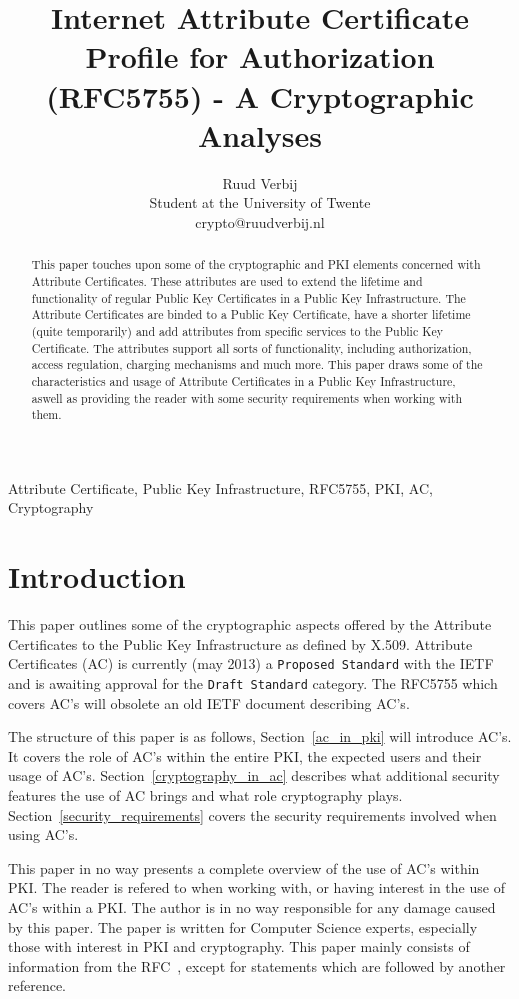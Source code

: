 \documentclass[10pt,conference,a4paper]{IEEEtran}
\title{Internet Attribute Certificate Profile for Authorization (RFC5755) - A Cryptographic Analyses}
\author{Ruud Verbij \\ Student at the University of Twente \\ crypto@ruudverbij.nl}
\begin{document}
\maketitle

\begin{abstract}
This paper touches upon some of the cryptographic and PKI elements concerned with Attribute Certificates. These attributes are used to extend the lifetime and functionality of regular Public Key Certificates in a Public Key Infrastructure. The Attribute Certificates are binded to a Public Key Certificate, have a shorter lifetime (quite temporarily) and add attributes from specific services to the Public Key Certificate. The attributes support all sorts of functionality, including authorization, access regulation, charging mechanisms and much more. This paper draws some of the characteristics and usage of Attribute Certificates in a Public Key Infrastructure, aswell as providing the reader with some security requirements when working with them.
\end{abstract}

\begin{IEEEkeywords}
Attribute Certificate, Public Key Infrastructure, RFC5755, PKI, AC, Cryptography
\end{IEEEkeywords}

\section{Introduction}
\label{Introduction}
This paper outlines some of the cryptographic aspects offered by the Attribute Certificates\cite{rfc_ac} to the Public Key Infrastructure as defined by X.509\cite{rfc_x509}. Attribute Certificates (AC) is currently (may 2013) a \texttt{Proposed Standard} with the IETF and is awaiting approval for the \texttt{Draft Standard} category. The RFC5755 which covers AC's will obsolete an old IETF document describing AC's\cite{rfc_oldac}.

The structure of this paper is as follows, Section~\ref{ac_in_pki} will introduce AC's. It covers the role of AC's within the entire PKI, the expected users and their usage of AC's. Section~\ref{cryptography_in_ac} describes what additional security features the use of AC brings and what role cryptography plays. Section~\ref{security_requirements} covers the security requirements involved when using AC's.  

This paper in no way presents a complete overview of the use of AC's within PKI. The reader is refered to \cite{rfc_ac} when working with, or having interest in the use of AC's within a PKI. The author is in no way responsible for any damage caused by this paper. The paper is written for Computer Science experts, especially those with interest in PKI and cryptography. This paper mainly consists of information from the RFC~\cite{rfc_ac}, except for statements which are followed by another reference.
\end{document}
